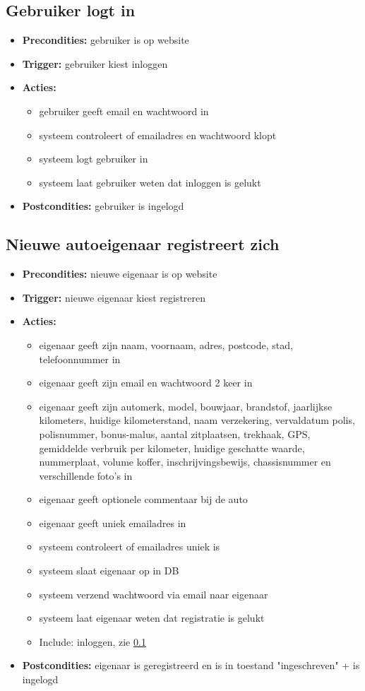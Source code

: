 \documentclass[]{article}
\begin{document}
\subsection{Gebruiker logt in} \label{inloggen}
\begin{itemize}
\item \textbf{Precondities:} gebruiker is op website
\item \textbf{Trigger:} gebruiker kiest inloggen
\item \textbf{Acties:} \begin{itemize}
\item	gebruiker geeft email en wachtwoord in
\item	systeem controleert of emailadres en wachtwoord klopt
\item 	systeem logt gebruiker in
\item      systeem laat gebruiker weten dat inloggen is gelukt
\end{itemize}
\item \textbf{Postcondities:} gebruiker is ingelogd
\end{itemize}

\subsection{Nieuwe autoeigenaar registreert zich}
\begin{itemize}
\item \textbf{Precondities:} nieuwe eigenaar is op website
\item \textbf{Trigger:} nieuwe eigenaar kiest registreren
\item \textbf{Acties:} \begin{itemize}
\item	eigenaar geeft zijn naam, voornaam, adres, postcode, stad, telefoonnummer in
\item	eigenaar geeft zijn email en wachtwoord 2 keer in
\item	eigenaar geeft zijn automerk, model, bouwjaar, brandstof, jaarlijkse kilometers, huidige kilometerstand, naam verzekering, vervaldatum polis, polisnummer, bonus-malus, aantal zitplaatsen, trekhaak, GPS, gemiddelde verbruik per kilometer, huidige geschatte waarde, nummerplaat, volume koffer, inschrijvingsbewijs, chassisnummer en verschillende foto's in
\item	eigenaar geeft optionele commentaar bij de auto
\item eigenaar geeft uniek emailadres in 
\item	systeem controleert of emailadres uniek is 
\item systeem slaat eigenaar op in DB
\item systeem verzend wachtwoord via email naar eigenaar
\item      systeem laat eigenaar weten dat registratie is gelukt
\item      Include: inloggen, zie \ref{inloggen}
\end{itemize}
\item \textbf{Postcondities:} eigenaar is geregistreerd en is in toestand "ingeschreven" + is ingelogd
\end{itemize}
\end{document}

